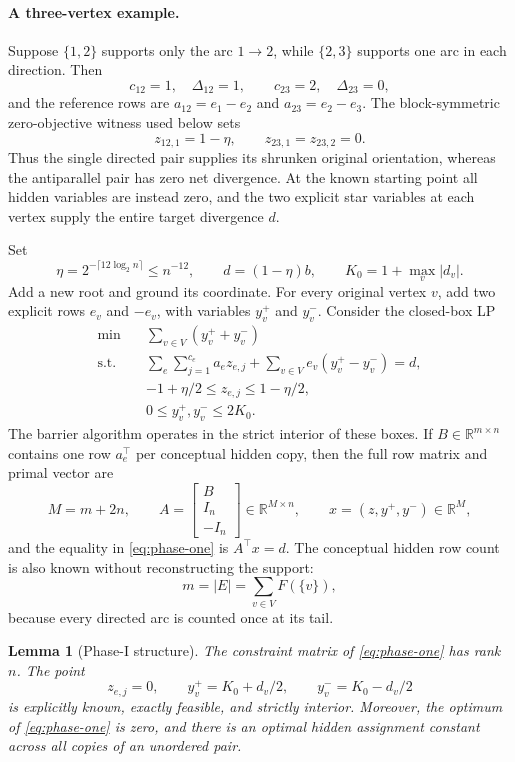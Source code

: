 \documentclass[11pt]{article}
\newtheorem{lemma}[theorem]{Lemma}
\theoremstyle{definition}
\newcommand{\R}{\mathbb{R}}
\begin{document}
\paragraph{A three-vertex example.}
Suppose $\{1,2\}$ supports only the arc $1\to2$, while $\{2,3\}$ supports one
arc in each direction.  Then
\[
 c_{12}=1,\quad \Delta_{12}=1,\qquad
 c_{23}=2,\quad \Delta_{23}=0,
\]
and the reference rows are $a_{12}=e_1-e_2$ and
$a_{23}=e_2-e_3$.  The block-symmetric zero-objective witness used below
sets
\[
 z_{12,1}=1-\eta,\qquad z_{23,1}=z_{23,2}=0.
\]
Thus the single directed pair supplies its shrunken original orientation,
whereas the antiparallel pair has zero net divergence.  At the known
starting point all hidden variables are instead zero, and the two explicit
star variables at each vertex supply the entire target divergence $d$.

Set
\[
        \eta=2^{-\lceil12\log_2n\rceil}\le n^{-12},
        \qquad d=(1-\eta)b,
        \qquad K_0=1+\max_v |d_v|.
\]
Add a new root and ground its coordinate.  For every original vertex $v$,
add two explicit rows $e_v$ and $-e_v$, with variables $y_v^+$ and $y_v^-$.
Consider the closed-box LP
\begin{equation}\label{eq:phase-one}
\begin{aligned}
 \min\quad & \sum_{v\in V}(y_v^++y_v^-) \\
 \text{s.t.}\quad &
   \sum_{e}\sum_{j=1}^{c_e}a_e z_{e,j}
      +\sum_{v\in V}e_v(y_v^+-y_v^-)=d,\\
 & -1+\eta/2\le z_{e,j}\le1-\eta/2,\\
 & 0\le y_v^+,y_v^-\le2K_0.
\end{aligned}
\end{equation}
The barrier algorithm operates in the strict interior of these boxes.
If $B\in\R^{m\times n}$ contains one row $a_e^\top$ per conceptual hidden
copy, then the full row matrix and primal vector are
\[
 M=m+2n,\qquad
 A=\begin{bmatrix}B\\I_n\\-I_n\end{bmatrix}
    \in\R^{M\times n},
 \qquad x=(z,y^+,y^-)\in\R^M,
\]
and the equality in \eqref{eq:phase-one} is $A^\top x=d$.
The conceptual hidden row count is also known without reconstructing the
support:
\[
        m=|E|=\sum_{v\in V}F(\{v\}),
\]
because every directed arc is counted once at its tail.

\begin{lemma}[Phase-I structure]\label{lem:phase-one}
The constraint matrix of \eqref{eq:phase-one} has rank $n$.  The point
\[
 z_{e,j}=0,\qquad
 y_v^+=K_0+d_v/2,\qquad y_v^-=K_0-d_v/2
\]
is explicitly known, exactly feasible, and strictly interior.  Moreover,
the optimum of \eqref{eq:phase-one} is zero, and there is an optimal hidden
assignment constant across all copies of an unordered pair.
\end{lemma}
\end{document}
